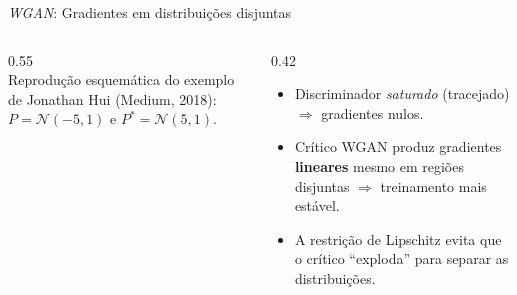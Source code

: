 \documentclass[aspectratio=169,xcolor=dvipsnames]{beamer}
\begin{document}
  \begin{frame}{\textit{WGAN}: Gradientes em distribuições disjuntas}
    \begin{columns}[T]
      \begin{column}{0.55\textwidth}
        \centering
        \wgangradientsfigure\\
        \tiny Reprodução esquemática do exemplo de Jonathan Hui (Medium,
        2018): $P=\mathcal{N}(-5,1)$ e $P^{*}=\mathcal{N}(5,1)$.
      \end{column}
      \begin{column}{0.42\textwidth}
        \begin{itemize}
          \item Discriminador \emph{saturado} (tracejado)
          $\Rightarrow$ gradientes nulos.
          \item Crítico WGAN produz gradientes \textbf{lineares} mesmo
          em regiões disjuntas $\Rightarrow$ treinamento mais
          estável.
          \item A restrição de Lipschitz evita que o crítico
          ``exploda'' para separar as distribuições.
        \end{itemize}
      \end{column}
    \end{columns}
  \end{frame}
\end{document}
